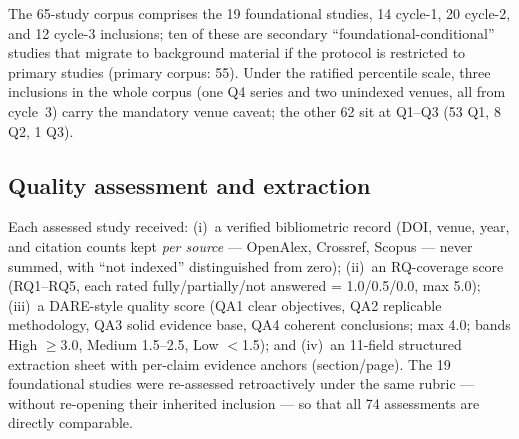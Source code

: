 \documentclass{ieeeaccess}
\begin{document}
The 65-study corpus comprises the 19 foundational studies, 14 cycle-1,
20 cycle-2, and 12 cycle-3 inclusions; ten of these are secondary
``foundational-conditional'' studies
\cite{P24,P33,P52,P54,P72,P77,P79,P110,P112,P121} that migrate to
background material if the protocol is restricted to primary studies
(primary corpus: 55). Under the ratified percentile scale, three
inclusions in the whole corpus (one Q4 series and two unindexed venues,
all from cycle~3) carry the mandatory venue caveat; the other 62 sit at
Q1--Q3 (53 Q1, 8 Q2, 1 Q3).

\subsection{Quality assessment and extraction}
Each assessed study received: (i)~a verified bibliometric record
(DOI, venue, year, and citation counts kept \emph{per source} ---
OpenAlex, Crossref, Scopus --- never summed, with ``not indexed''
distinguished from zero); (ii)~an RQ-coverage score (RQ1--RQ5, each
rated fully/partially/not answered = 1.0/0.5/0.0, max 5.0); (iii)~a
DARE-style quality score (QA1 clear objectives, QA2 replicable
methodology, QA3 solid evidence base, QA4 coherent conclusions; max
4.0; bands High $\geq$3.0, Medium 1.5--2.5, Low $<$1.5); and (iv)~an
11-field structured extraction sheet with per-claim evidence anchors
(section/page). The 19 foundational studies were re-assessed
retroactively under the same rubric --- without re-opening their
inherited inclusion --- so that all 74 assessments are directly
comparable.
\end{document}
